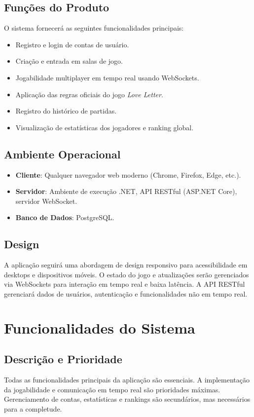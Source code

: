 \documentclass{scrreprt}
\begin{document}
\section{Funções do Produto}
O sistema fornecerá as seguintes funcionalidades principais:
\begin{itemize}
    \item Registro e login de contas de usuário.
    \item Criação e entrada em salas de jogo.
    \item Jogabilidade multiplayer em tempo real usando WebSockets.
    \item Aplicação das regras oficiais do jogo \textit{Love Letter}.
    \item Registro do histórico de partidas.
    \item Visualização de estatísticas dos jogadores e ranking global.
\end{itemize}

\section{Ambiente Operacional}
\begin{itemize}
    \item \textbf{Cliente}: Qualquer navegador web moderno (Chrome, Firefox, Edge, etc.).
    \item \textbf{Servidor}: Ambiente de execução .NET, API RESTful (ASP.NET Core), servidor WebSocket.
    \item \textbf{Banco de Dados}: PostgreSQL.
\end{itemize}

\section{Design}
A aplicação seguirá uma abordagem de design responsivo para acessibilidade em desktops e dispositivos móveis. O estado do jogo e atualizações serão gerenciados via WebSockets para interação em tempo real e baixa latência. A API RESTful gerenciará dados de usuários, autenticação e funcionalidades não em tempo real.

\chapter{Funcionalidades do Sistema}

\section{Descrição e Prioridade}
Todas as funcionalidades principais da aplicação são essenciais. A implementação da jogabilidade e comunicação em tempo real são prioridades máximas. Gerenciamento de contas, estatísticas e rankings são secundários, mas necessários para a completude.
\end{document}
